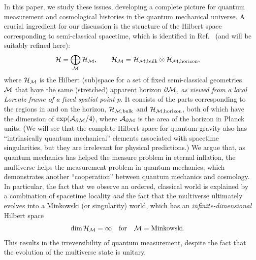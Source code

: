 \documentclass[12pt]{article}
\begin{document}
In this paper, we study these issues, developing a complete picture 
for quantum measurement and cosmological histories in the quantum 
mechanical universe.  A crucial ingredient for our discussion is the 
structure of the Hilbert space corresponding to semi-classical spacetime, 
which is identified in Ref.~\cite{Nomura:2011dt} (and will be suitably 
refined here):
%
\begin{equation}
  {\cal H} = \bigoplus_{\cal M} {\cal H}_{\cal M},
\qquad
  {\cal H}_{\cal M} = {\cal H}_{{\cal M}, {\rm bulk}} 
    \otimes {\cal H}_{{\cal M}, {\rm horizon}},
\label{eq:multiverse-H}
\end{equation}
%
where ${\cal H}_{\cal M}$ is the Hilbert (sub)space for a set of fixed 
semi-classical geometries ${\cal M}$ that have the same (stretched) 
apparent horizon $\partial {\cal M}$, {\it as viewed from a local 
Lorentz frame of a fixed spatial point $p$}.  It consists of the parts 
corresponding to the regions in and on the horizon, ${\cal H}_{{\cal M}, 
{\rm bulk}}$ and ${\cal H}_{{\cal M}, {\rm horizon}}$, both of which 
have the dimension of $\exp({\cal A}_{\partial {\cal M}}/4)$, where 
${\cal A}_{\partial {\cal M}}$ is the area of the horizon in Planck units. 
(We will see that the complete Hilbert space for quantum gravity also 
has ``intrinsically quantum mechanical'' elements associated with 
spacetime singularities, but they are irrelevant for physical predictions.) 
We argue that, as quantum mechanics has helped the measure problem in 
eternal inflation, the multiverse helps the measurement problem in quantum 
mechanics, which demonstrates another ``cooperation'' between quantum 
mechanics and cosmology.  In particular, the fact that we observe 
an ordered, classical world is explained by a combination of 
spacetime locality {\it and} the fact that the multiverse ultimately 
evolves into a Minkowski (or singularity) world, which has an 
{\it infinite-dimensional} Hilbert space
%
\begin{equation}
  {\rm dim}\,{\cal H}_{\cal M} = \infty
\quad\mbox{for}\quad
  {\cal M} = {\rm Minkowski}.
\label{eq:Minkowski-inf}
\end{equation}
%
This results in the irreversibility of quantum measurement, despite the 
fact that the evolution of the multiverse state is unitary.
\end{document}
